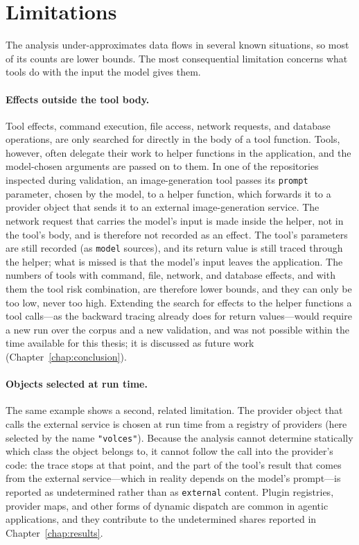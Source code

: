 \section{Limitations}
\label{sec:df-limitations}

The analysis under-approximates data flows in several known situations, so most of its counts are lower bounds. The most consequential limitation concerns what tools do with the input the model gives them.

\paragraph{Effects outside the tool body.} Tool effects, command execution, file access, network requests, and database operations, are only searched for directly in the body of a tool function. Tools, however, often delegate their work to helper functions in the application, and the model-chosen arguments are passed on to them. In one of the repositories inspected during validation, an image-generation tool passes its \texttt{prompt} parameter, chosen by the model, to a helper function, which forwards it to a provider object that sends it to an external image-generation service. The network request that carries the model's input is made inside the helper, not in the tool's body, and is therefore not recorded as an effect. The tool's parameters are still recorded (as \texttt{model} sources), and its return value is still traced through the helper; what is missed is that the model's input leaves the application. The numbers of tools with command, file, network, and database effects, and with them the tool risk combination, are therefore lower bounds, and they can only be too low, never too high. Extending the search for effects to the helper functions a tool calls---as the backward tracing already does for return values---would require a new run over the corpus and a new validation, and was not possible within the time available for this thesis; it is discussed as future work (Chapter~\ref{chap:conclusion}).

\paragraph{Objects selected at run time.} The same example shows a second, related limitation. The provider object that calls the external service is chosen at run time from a registry of providers (here selected by the name \texttt{"volces"}). Because the analysis cannot determine statically which class the object belongs to, it cannot follow the call into the provider's code: the trace stops at that point, and the part of the tool's result that comes from the external service---which in reality depends on the model's prompt---is reported as undetermined rather than as \texttt{external} content. Plugin registries, provider maps, and other forms of dynamic dispatch are common in agentic applications, and they contribute to the undetermined shares reported in Chapter~\ref{chap:results}.

